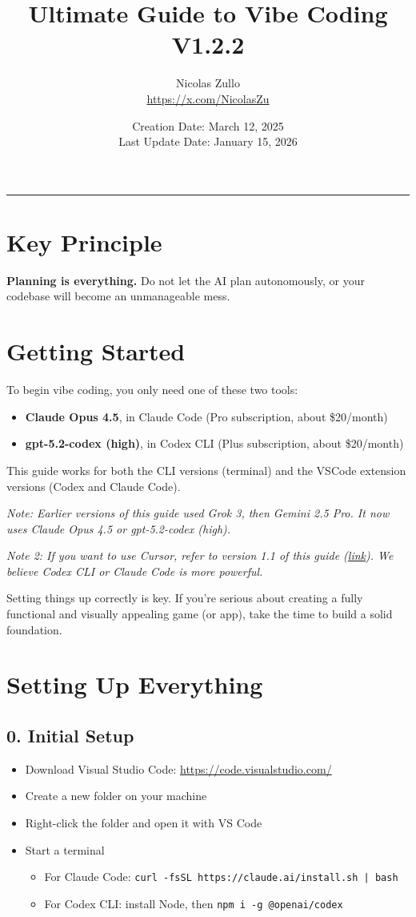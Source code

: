 \documentclass[12pt]{article}
\title{Ultimate Guide to Vibe Coding V1.2.2}
\author{Nicolas Zullo \\ \href{https://x.com/NicolasZu}{https://x.com/NicolasZu}}
\date{Creation Date: March 12, 2025 \\ Last Update Date: January 15, 2026}
\begin{document}
\maketitle
\bigskip
\hrule
\bigskip

\section*{Key Principle}
\textbf{Planning is everything.} Do not let the AI plan autonomously, or your codebase will become an unmanageable mess.

\section{Getting Started}
To begin vibe coding, you only need one of these two tools:
\begin{itemize}
  \item \textbf{Claude Opus 4.5}, in Claude Code (Pro subscription, about \$20/month)
  \item \textbf{gpt-5.2-codex (high)}, in Codex CLI (Plus subscription, about \$20/month)
\end{itemize}
This guide works for both the CLI versions (terminal) and the VSCode extension versions (Codex and Claude Code).

\textit{Note: Earlier versions of this guide used Grok 3, then Gemini 2.5 Pro. It now uses Claude Opus 4.5 or gpt-5.2-codex (high).}

\textit{Note 2: If you want to use Cursor, refer to version 1.1 of this guide (\href{https://github.com/EnzeD/vibe-coding/tree/1.1.1}{link}). We believe Codex CLI or Claude Code is more powerful.}

Setting things up correctly is key. If you're serious about creating a fully functional and visually appealing game (or app), take the time to build a solid foundation.

\section{Setting Up Everything}
\subsection{0. Initial Setup}
\begin{itemize}
  \item Download Visual Studio Code: \href{https://code.visualstudio.com/}{https://code.visualstudio.com/}
  \item Create a new folder on your machine
  \item Right-click the folder and open it with VS Code
  \item Start a terminal
  \begin{itemize}
    \item For Claude Code: \texttt{curl -fsSL https://claude.ai/install.sh | bash}
    \item For Codex CLI: install Node, then \texttt{npm i -g @openai/codex}
  \end{itemize}
\end{itemize}
\end{document}
